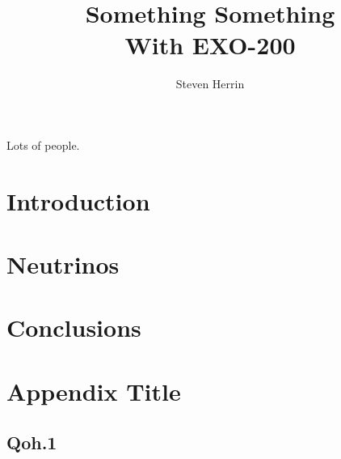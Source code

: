 \documentclass[12pt,twoside]{report}
\begin{document}
\title{Something Something\\
         With EXO-200}
\author{Steven Herrin}
 
\beforepreface



Lots of people.

\afterpreface
 
\chapter{Introduction}


\chapter{Neutrinos}


\chapter{Conclusions}


\appendix
\chapter{Appendix Title}

\section{Qoh.1}




\onlinesignature
\end{document}
